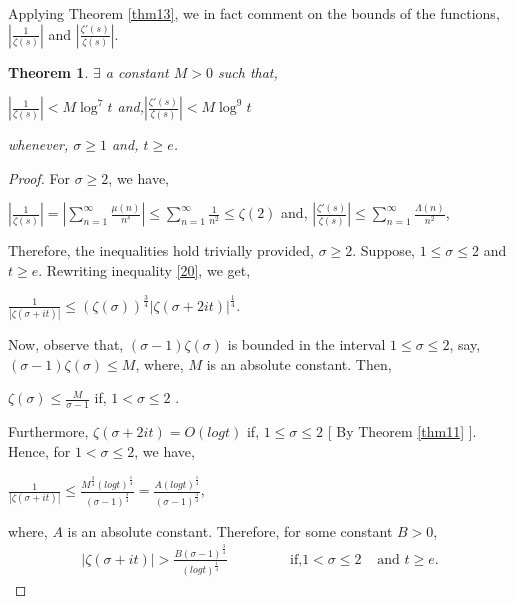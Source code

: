\documentclass[article,12pt]{elsarticle}
\newtheorem{thm}{Theorem}[section]
\begin{document}
	Applying Theorem \eqref{thm13}, we in fact comment on the bounds of the functions, $|\frac{1}{\zeta(s)}|$ and $|\frac{\zeta'(s)}{\zeta(s)}|$.
	\begin{thm}\label{thm15}
		$\exists$ a constant $M>0$ such that,
		\begin{center}
			$|\frac{1}{\zeta(s)}|<M\log^{7}t$ \hspace{10pt}and,\hspace{10pt}$|\frac{\zeta'(s)}{\zeta(s)}|<M\log^{9}t$  
		\end{center}
		whenever, $\sigma\geq 1$ and,  $t\geq e$.
	\end{thm}
	\begin{proof}
		For $\sigma\geq 2$, we have,
		\begin{center}
			$|\frac{1}{\zeta(s)}|=|\sum\limits_{n=1}^{\infty}\frac{\mu(n)}{n^{s}}|\leq \sum\limits_{n=1}^{\infty}\frac{1}{n^{2}}\leq \zeta(2)$ \hspace{10pt} and, \hspace{10pt} $|\frac{\zeta'(s)}{\zeta(s)}|\leq \sum\limits_{n=1}^{\infty}\frac{\Lambda(n)}{n^{2}}$,
		\end{center}
		Therefore, the inequalities hold trivially provided, $\sigma\geq 2$. Suppose, $1\leq \sigma\leq 2$ and $t\geq e$. Rewriting inequality \eqref{20}, we get,
		\begin{center}
			$\frac{1}{|\zeta(\sigma+it)|}\leq (\zeta(\sigma))^{\frac{3}{4}}|\zeta(\sigma+2it)|^{\frac{1}{4}}$.
		\end{center}	
		Now, observe that, $(\sigma-1)\zeta(\sigma)$ is bounded in the interval $1\leq \sigma\leq 2$, say,  $(\sigma-1)\zeta(\sigma)\leq M$, where, $M$ is an absolute constant. Then,
		\begin{center}
			$\zeta(\sigma)\leq \frac{M}{\sigma-1}$ \hspace{20pt} if, \hspace{10pt} $1< \sigma\leq 2$ .
		\end{center}	
		Furthermore, $\zeta(\sigma+2it)=O(logt)$ if, $1\leq \sigma\leq 2$  [ By Theorem \eqref{thm11} ]. Hence, for $1< \sigma\leq 2$, we have,
		\begin{center}
			$\frac{1}{|\zeta(\sigma+it)|}\leq \frac{M^{\frac{3}{4}}(logt)^{\frac{1}{4}}}{(\sigma-1)^{\frac{3}{4}}}=\frac{A(logt)^{\frac{1}{4}}}{(\sigma-1)^{\frac{3}{4}}}$,
		\end{center}	
		where, $A$ is an absolute constant. Therefore, for some constant $B>0$, 
		\begin{eqnarray}\label{22}
			|\zeta(\sigma+it)|>\frac{B(\sigma-1)^{\frac{3}{4}}}{(logt)^{\frac{1}{4}}} \hspace{40pt} &\mbox{ if,} 1<\sigma\leq 2 &\mbox{ and  } t\geq e.

\end{eqnarray}
\end{proof}
\end{document}
